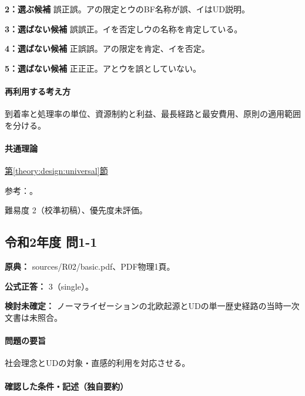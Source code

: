 \noindent\textbf{2：選ぶ候補} 誤正誤。アの限定とウのBF名称が誤、イはUD説明。\par

\noindent\textbf{3：選ばない候補} 誤誤正。イを否定しウの名称を肯定している。\par

\noindent\textbf{4：選ばない候補} 正誤誤。アの限定を肯定、イを否定。\par

\noindent\textbf{5：選ばない候補} 正正正。アとウを誤としていない。\par

\paragraph{再利用する考え方} 到着率と処理率の単位、資源制約と利益、最長経路と最安費用、原則の適用範囲を分ける。

\paragraph{共通理論} \hyperref[theory:design:universal]{第\ref*{theory:design:universal}節}

\par 参考：\cite{design48_ud}。

\par 難易度 2（校準初稿）、優先度未評価。

\subsection{令和2年度 問1-1}
\label{q:r02-reg-basic-1-1}

\noindent\textbf{原典：} sources/R02/basic.pdf、PDF物理1頁。

\textbf{公式正答：} 3（single）。

\par\textbf{検討未確定：} ノーマライゼーションの北欧起源とUDの単一歴史経路の当時一次文書は未照合。

\paragraph{問題の要旨} 社会理念とUDの対象・直感的利用を対応させる。

\paragraph{確認した条件・記述（独自要約）}\mbox{}\par

